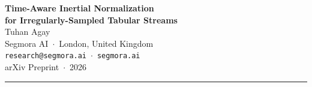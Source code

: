 \documentclass[11pt,a4paper]{article}
\begin{document}
\begin{center}
  {\LARGE\bfseries\color{navyblue} Time-Aware Inertial Normalization}\\[6pt]
  {\LARGE\bfseries\color{navyblue} for Irregularly-Sampled Tabular Streams}\\[14pt]
  {\large Tuhan Agay}\\[4pt]
  {\normalsize Segmora AI~$\cdot$~London, United Kingdom}\\[2pt]
  {\normalsize \texttt{research@segmora.ai}~$\cdot$~\texttt{segmora.ai}}\\[4pt]
  {\normalsize\color{steelgray} arXiv Preprint~$\cdot$~2026}
\end{center}

\vspace{8pt}
{\color{tealblue}\rule{\linewidth}{1pt}}
\vspace{8pt}
\end{document}

